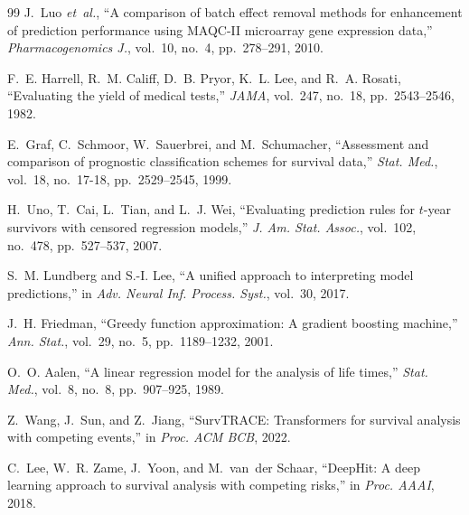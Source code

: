 \documentclass[journal]{IEEEtran}
\begin{document}
\begin{thebibliography}{99}
J.~Luo \textit{et~al.},
``A comparison of batch effect removal methods for enhancement of prediction performance using MAQC-II microarray gene expression data,''
\textit{Pharmacogenomics J.}, vol.~10, no.~4, pp.~278--291, 2010.

F.~E. Harrell, R.~M. Califf, D.~B. Pryor, K.~L. Lee, and R.~A. Rosati,
``Evaluating the yield of medical tests,''
\textit{JAMA}, vol.~247, no.~18, pp.~2543--2546, 1982.

E.~Graf, C.~Schmoor, W.~Sauerbrei, and M.~Schumacher,
``Assessment and comparison of prognostic classification schemes for survival data,''
\textit{Stat. Med.}, vol.~18, no.~17-18, pp.~2529--2545, 1999.

H.~Uno, T.~Cai, L.~Tian, and L.~J. Wei,
``Evaluating prediction rules for $t$-year survivors with censored regression models,''
\textit{J. Am. Stat. Assoc.}, vol.~102, no.~478, pp.~527--537, 2007.

S.~M. Lundberg and S.-I. Lee,
``A unified approach to interpreting model predictions,''
in \textit{Adv. Neural Inf. Process. Syst.}, vol.~30, 2017.

J.~H. Friedman,
``Greedy function approximation: A gradient boosting machine,''
\textit{Ann. Stat.}, vol.~29, no.~5, pp.~1189--1232, 2001.

O.~O. Aalen,
``A linear regression model for the analysis of life times,''
\textit{Stat. Med.}, vol.~8, no.~8, pp.~907--925, 1989.

Z.~Wang, J.~Sun, and Z.~Jiang,
``SurvTRACE: Transformers for survival analysis with competing events,''
in \textit{Proc. ACM BCB}, 2022.

C.~Lee, W.~R. Zame, J.~Yoon, and M.~van~der Schaar,
``DeepHit: A deep learning approach to survival analysis with competing risks,''
in \textit{Proc. AAAI}, 2018.

\end{thebibliography}
\end{document}
